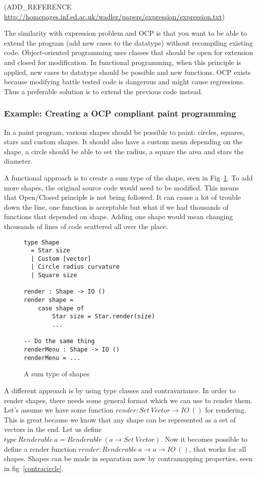 (ADD\_REFERENCE \url{http://homepages.inf.ed.ac.uk/wadler/papers/expression/expression.txt})

The similarity with expression problem and OCP is that you want to be able to
extend the program (add new cases to the datatype) without recompiling existing
code.  Object-oriented programming uses classes that should be open for
extension and closed for modification. In functional programming, when this
principle is applied, new cases to datatype should be possible and new
functions.  OCP exists because modifying battle tested code is dangerous and
might cause regressions. Thus a preferable solution is to extend the previous
code instead.

\subsubsection{Example: Creating a OCP compliant paint programming}

In a paint program, various shapes should be possible to paint: circles,
squares, stars and custom shapes. It should also have a custom menu depending on
the shape, a circle should be able to set the radius, a square the area and
stars the diameter.

A functional approach is to create a sum type of the shape, seen in
Fig~\ref{sumtypeshapes}.  To add more shapes, the original source code would
need to be modified.  This means that Open/Closed principle is not being
followed. It can cause a lot of trouble down the line, one function is
acceptable but what if we had thousands of functions that depended on shape.
Adding one shape would mean changing thousands of lines of code scattered all
over the place.

\begin{figure}[H]
    \begin{lstlisting}
type Shape 
  = Star size
  | Custom [vector]
  | Circle radius curvature
  | Square size

render : Shape -> IO ()
render shape =
	case shape of
		Star size = Star.render(size)
		...

-- Do the same thing
renderMenu : Shape -> IO ()
renderMenu = ...
    \end{lstlisting}
    \caption{A sum type of shapes}
    \label{sumtypeshapes}
\end{figure}

A different approach is by using type classes and contravariance.  In order to
render shapes, there needs some general format which we can use to render them.
Let's assume we have some function $render : Set\ Vector \rightarrow IO\ ()$ for
rendering. This is great because we know that any shape can be represented as a
set of vectors in the end. Let us define $type\ Renderable\ a = Renderable\ (a \rightarrow
Set\ Vector)$. Now it becomes possible to define a render function $render :
Renderable\ a \rightarrow a \rightarrow IO\ ()$, that works for all shapes.  Shapes can be made in
separation now by contramapping properties, seen in fig~\ref{contracircle}.

